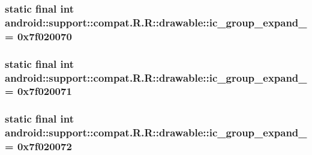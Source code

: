 \hypertarget{classandroid_1_1support_1_1compat_1_1_r_1_1drawable_b0b0b92cbc32e38b1b748915cade1e60}{
\subsubsection[{ic\_\-group\_\-expand\_\-01}]{\setlength{\rightskip}{0pt plus 5cm}static final int android::support::compat.R.R::drawable::ic\_\-group\_\-expand\_ = 0x7f020070}}
\label{classandroid_1_1support_1_1compat_1_1_r_1_1drawable_b0b0b92cbc32e38b1b748915cade1e60}


\hypertarget{classandroid_1_1support_1_1compat_1_1_r_1_1drawable_3a83b1f48b7e80755df7d3dd133c389f}{
\subsubsection[{ic\_\-group\_\-expand\_\-02}]{\setlength{\rightskip}{0pt plus 5cm}static final int android::support::compat.R.R::drawable::ic\_\-group\_\-expand\_ = 0x7f020071}}
\label{classandroid_1_1support_1_1compat_1_1_r_1_1drawable_3a83b1f48b7e80755df7d3dd133c389f}


\hypertarget{classandroid_1_1support_1_1compat_1_1_r_1_1drawable_a3ecff2a2ba11b6d1527067ce7e9aa30}{
\subsubsection[{ic\_\-group\_\-expand\_\-03}]{\setlength{\rightskip}{0pt plus 5cm}static final int android::support::compat.R.R::drawable::ic\_\-group\_\-expand\_ = 0x7f020072}}
\label{classandroid_1_1support_1_1compat_1_1_r_1_1drawable_a3ecff2a2ba11b6d1527067ce7e9aa30}


